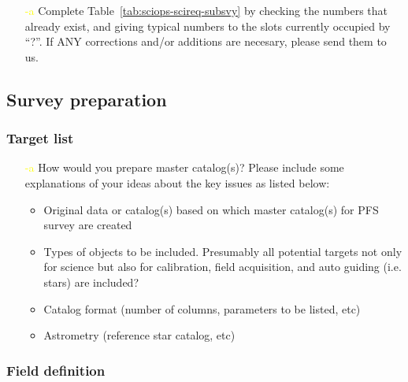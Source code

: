 \documentclass[a4paper,notitlepage]{article}
\newcommand{\colm}[1]{\textcolor{yellow}{\thesubsubsection-#1}}
\begin{document}
\begin{enumerate}
  \item[\colm{a}] Complete Table~\ref{tab:sciops-scireq-subsvy} by
           checking the numbers that already exist, and giving
           typical numbers to the slots currently occupied by
           ``?''. If ANY corrections and/or additions are necesary,
           please send them to us.
\end{enumerate}

\subsection{Survey preparation}

\subsubsection{Target list}

\begin{enumerate}
 \item[\colm{a}] How would you prepare master catalog(s)?  Please
          include some explanations of your ideas about the key
          issues as listed below:
          \begin{itemize}
           \item Original data or catalog(s) based on which master
             catalog(s) for PFS survey are created
           \item Types of objects to be included. Presumably all
             potential targets not only for science but also for
             calibration, field acquisition, and auto guiding
             (i.e. stars) are included?
           \item Catalog format (number of columns, parameters to be
             listed, etc)
           \item Astrometry (reference star catalog, etc)
          \end{itemize}
\end{enumerate}

\subsubsection{Field definition}
\end{document}
